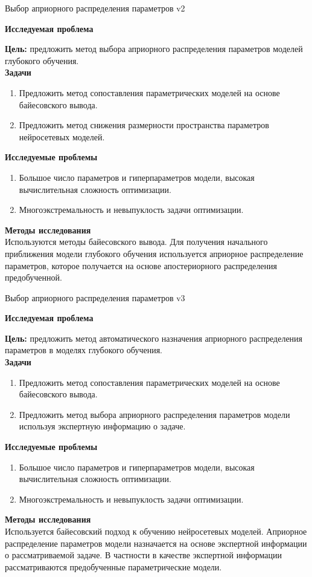 \documentclass[10pt,pdf,hyperref={unicode}]{beamer}
\begin{document}
\begin{frame}{Выбор априорного распределения параметров v2}
\justifying

\textbf{Исследуемая проблема}

\textbf{Цель:} предложить метод выбора априорного распределения параметров моделей глубокого обучения.\\
\textbf{Задачи}
\begin{enumerate}
\item Предложить метод сопоставления параметрических моделей на основе байесовского вывода.
\item Предложить метод снижения размерности пространства параметров нейросетевых моделей.
\end{enumerate}
\textbf{Исследуемые проблемы}
\begin{enumerate}
\item Большое число параметров и гиперпараметров модели, высокая вычислительная сложность оптимизации.
\item Многоэкстремальность и невыпуклость задачи оптимизации.
\end{enumerate}
\textbf{Методы исследования}\\ 
Используются методы байесовского вывода. Для получения начального приближения модели глубокого обучения используется априорное распределение параметров, которое получается на основе апостериорного распределения предобученной. 
\end{frame}

\begin{frame}{Выбор априорного распределения параметров v3}
\justifying

\textbf{Исследуемая проблема}

\textbf{Цель:} предложить метод автоматического назначения априорного распределения параметров в моделях глубокого обучения.\\
\textbf{Задачи}
\begin{enumerate}
\item Предложить метод сопоставления параметрических моделей на основе байесовского вывода.
\item Предложить метод выбора априорного распределения параметров модели используя экспертную информацию о задаче.
\end{enumerate}
\textbf{Исследуемые проблемы}
\begin{enumerate}
\item Большое число параметров и гиперпараметров модели, высокая вычислительная сложность оптимизации.
\item Многоэкстремальность и невыпуклость задачи оптимизации.
\end{enumerate}
\textbf{Методы исследования}\\ 
Используется байесовский подход к обучению нейросетевых моделей. Априорное распределение параметров модели назначается на основе экспертной информации о рассматриваемой задаче. В частности в качестве экспертной информации рассматриваются предобученные параметрические модели.
\end{frame}
\end{document}
